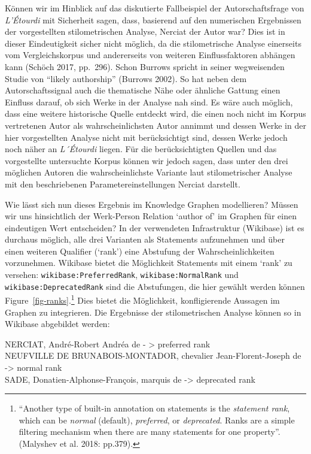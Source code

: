 \documentclass[
  12pt,
  letterpaper,
]{classicthesis}
\begin{document}
Können wir im Hinblick auf das diskutierte Fallbeispiel der
Autorschaftsfrage von \emph{L'Étourdi} mit Sicherheit sagen, dass,
basierend auf den numerischen Ergebnissen der vorgestellten
stilometrischen Analyse, Nerciat der Autor war? Dies ist in dieser
Eindeutigkeit sicher nicht möglich, da die stilometrische Analyse
einerseits vom Vergleichskorpus und andererseits von weiteren
Einflussfaktoren abhängen kann (Schöch 2017, pp.~296). Schon Burrows
spricht in seiner wegweisenden Studie von ``likely authorship'' (Burrows
2002). So hat neben dem Autorschaftssignal auch die thematische Nähe
oder ähnliche Gattung einen Einfluss darauf, ob sich Werke in der
Analyse nah sind. Es wäre auch möglich, dass eine weitere historische
Quelle entdeckt wird, die einen noch nicht im Korpus vertretenen Autor
als wahrscheinlichsten Autor annimmt und dessen Werke in der hier
vorgestellten Analyse nicht mit berücksichtigt sind, dessen Werke jedoch
noch näher an \emph{L´Étourdi} liegen. Für die berücksichtigten Quellen
und das vorgestellte untersuchte Korpus können wir jedoch sagen, dass
unter den drei möglichen Autoren die wahrscheinlichste Variante laut
stilometrischer Analyse mit den beschriebenen Parametereinstellungen
Nerciat darstellt.

Wie lässt sich nun dieses Ergebnis im Knowledge Graphen modellieren?
Müssen wir uns hinsichtlich der Werk-Person Relation `author of' im
Graphen für einen eindeutigen Wert entscheiden? In der verwendeten
Infrastruktur (Wikibase) ist es durchaus möglich, alle drei Varianten
als Statements aufzunehmen und über einen weiteren Qualifier (`rank')
eine Abstufung der Wahrscheinlichkeiten vorzunehmen. Wikibase bietet die
Möglichkeit Statements mit einem `rank' zu versehen:
\texttt{wikibase:PreferredRank}, \texttt{wikibase:NormalRank} und
\texttt{wikibase:DeprecatedRank} sind die Abstufungen, die hier gewählt
werden können Figure~\ref{fig-ranks}.\footnote{``Another type of
  built-in annotation on statements is the \emph{statement rank}, which
  can be \emph{normal} (default), \emph{preferred}, or
  \emph{deprecated}. Ranks are a simple filtering mechanism when there
  are many statements for one property''. (Malyshev et al. 2018:
  pp.379).} Dies bietet die Möglichkeit, konfligierende Aussagen im
Graphen zu integrieren. Die Ergebnisse der stilometrischen Analyse
können so in Wikibase abgebildet werden:

NERCIAT, André-Robert Andréa de - \textgreater{} preferred rank\\
NEUFVILLE DE BRUNABOIS-MONTADOR, chevalier Jean-Florent-Joseph de
-\textgreater{} normal rank\\
SADE, Donatien-Alphonse-François, marquis de -\textgreater{} deprecated
rank
\end{document}
